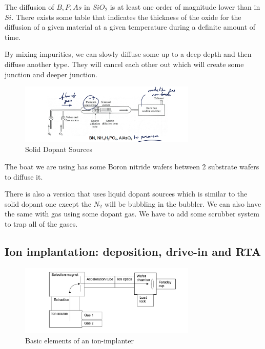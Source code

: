 \documentclass[
]{article}
\begin{document}
The diffusion of \(B,P,As\) in \(SiO_2\) is at least one order of
magnitude lower than in \(Si\). There exists some table that indicates
the thickness of the oxide for the diffusion of a given material at a
given temperature during a definite amount of time.

By mixing impurities, we can slowly diffuse some up to a deep depth and
then diffuse another type. They will cancel each other out which will
create some junction and deeper junction.

\begin{figure}
\hypertarget{fig:SDS-label}{%
\centering
\includegraphics[width=0.75\textwidth,height=\textheight]{solid_dopant_sources.png}
\caption{Solid Dopant Sources}\label{fig:SDS-label}
}
\end{figure}

The boat we are using has some Boron nitride wafers between 2 substrate
wafers to diffuse it.

There is also a version that uses liquid dopant sources which is similar
to the solid dopant one except the \(N_2\) will be bubbling in the
bubbler. We can also have the same with gas using some dopant gas. We
have to add some scrubber system to trap all of the gases.

\hypertarget{ion-implantation-deposition-drive-in-and-rta}{%
\subsection{Ion implantation: deposition, drive-in and
RTA}\label{ion-implantation-deposition-drive-in-and-rta}}

\begin{figure}
\hypertarget{fig:ion-implanter-label}{%
\centering
\includegraphics[width=0.75\textwidth,height=\textheight]{ion_implantation.png}
\caption{Basic elements of an
ion-implanter}\label{fig:ion-implanter-label}
}
\end{figure}
\end{document}
